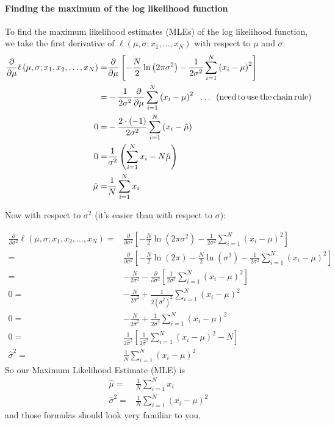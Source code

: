 \documentclass[12pt,english]{article}
\begin{document}
\paragraph{Finding the maximum of the log likelihood function}

To find the maximum likelihood estimates (MLEs) of the log likelihood function, we take the first derivative of $\ell\left(\mu,\sigma;x_{1},\ldots,x_{N}\right)$ with respect to $\mu$ and $\sigma$:
\begin{align}
\frac{\partial}{\partial\mu}\ell\left(\mu,\sigma;x_{1},x_{2},\ldots,x_{N}\right)= & \frac{\partial}{\partial\mu}\left[-\frac{N}{2}\ln\left(2\pi\sigma^{2}\right)-\frac{1}{2\sigma^{2}}\sum_{i=1}^{N}\left(x_{i}-\mu\right)^{2}\right]\nonumber \\
= & -\frac{1}{2\sigma^{2}}\frac{\partial}{\partial\mu}\sum_{i=1}^{N}\left(x_{i}-\mu\right)^{2}\,\,\,\,\ldots\,\,\,\text{(need\,to\,use\,the\,chain\,rule)}\nonumber \\
0= & -\frac{2\cdot\left(-1\right)}{2\sigma^{2}}\sum_{i=1}^{N}\left(x_{i}-\hat{\mu}\right)\label{eq:11}\\
0= & \frac{1}{\sigma^{2}}\left(\sum_{i=1}^{N}x_{i}-N\hat{\mu}\right)\nonumber \\
\hat{\mu}= & \frac{1}{N}\sum_{i=1}^{N}x_{i}\nonumber 
\end{align}

Now with respect to $\sigma^{2}$ (it's easier than with respect to $\sigma$):

\begin{align}
\frac{\partial}{\partial\sigma^{2}}\ell\left(\mu,\sigma;x_{1},x_{2},\ldots,x_{N}\right)= & \frac{\partial}{\partial\sigma^{2}}\left[-\frac{N}{2}\ln\left(2\pi\sigma^{2}\right)-\frac{1}{2\sigma^{2}}\sum_{i=1}^{N}\left(x_{i}-\mu\right)^{2}\right] \nonumber \\
= & \frac{\partial}{\partial\sigma^{2}}\left[-\frac{N}{2}\ln\left(2\pi\right)-\frac{N}{2}\ln\left(\sigma^{2}\right)-\frac{1}{2\sigma^{2}}\sum_{i=1}^{N}\left(x_{i}-\mu\right)^{2}\right] \nonumber \\
= & -\frac{N}{2\sigma^{2}}-\frac{\partial}{\partial\sigma^{2}}\left[\frac{1}{2\sigma^{2}}\sum_{i=1}^{N}\left(x_{i}-\mu\right)^{2}\right] \nonumber \\
0= & -\frac{N}{2\hat{\sigma}^{2}}+\frac{1}{2\left(\hat{\sigma}^{2}\right)^{2}}\sum_{i=1}^{N}\left(x_{i}-\mu\right)^{2}\\
0= & -\frac{N}{2\hat{\sigma}^{2}}+\frac{1}{2\hat{\sigma}^{4}}\sum_{i=1}^{N}\left(x_{i}-\mu\right)^{2} \nonumber \\
0= & \frac{1}{2\hat{\sigma}^{2}}\left[\frac{1}{2\hat{\sigma}^{2}}\sum_{i=1}^{N}\left(x_{i}-\mu\right)^{2}-N\right] \nonumber \\
\hat{\sigma}^{2}= & \frac{1}{N}\sum_{i=1}^{N}\left(x_{i}-\mu\right)^{2} \nonumber
\end{align}
So our Maximum Likelihood Estimate (MLE) is
\begin{align*}
\hat{\mu}= & \frac{1}{N}\sum_{i=1}^{N}x_{i}\\
\hat{\sigma}^{2}= & \frac{1}{N}\sum_{i=1}^{N}\left(x_{i}-\mu\right)^{2}
\end{align*}
and those formulas should look very familiar to you.
\end{document}
